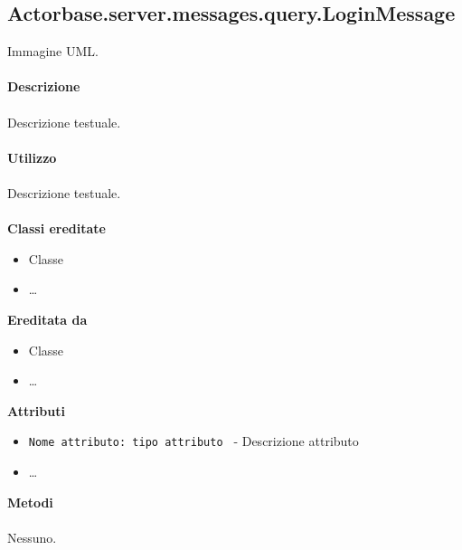 \documentclass[a4paper]{article}
\begin{document}
	\subsection{Actorbase.server.messages.query.LoginMessage}
		Immagine UML.
		\\ \\
		\textbf{Descrizione}
			\\ \\
			Descrizione testuale.
			\\ \\
		\textbf{Utilizzo}
			\\ \\
			Descrizione testuale.
			\\ \\
		\textbf{Classi ereditate}
			\begin{itemize}
				\item Classe
				\item \dots
			\end{itemize}
		\textbf{Ereditata da}
			\begin{itemize}
				\item Classe
				\item \dots
			\end{itemize}
		\textbf{Attributi}
			\begin{itemize}
				\item \texttt{Nome attributo: tipo attributo } - Descrizione attributo
				\item \dots
			\end{itemize}
		\textbf{Metodi}
			\\ \\
			Nessuno.
			
\end{document}
